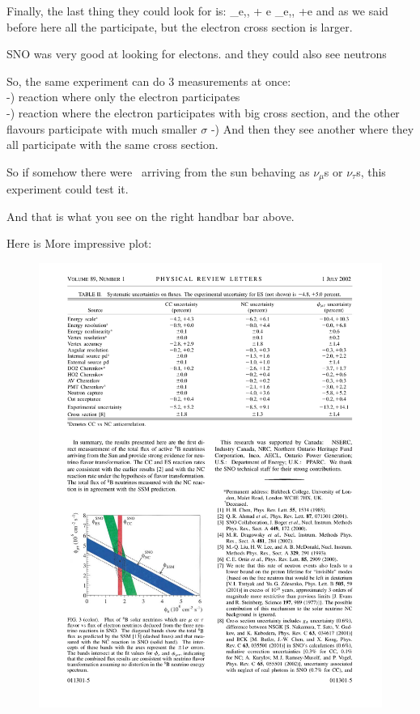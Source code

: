 {Finally,  the last thing they could look for is:
\be
\nu_{e,\mu,\tau} + e  \rightarrow \nu_{e,\mu,\tau} +e
\ee
and as we said before here all the \nus participate, but the electron cross section is larger.

SNO was very good at looking for electons. and they could also see neutrons

So, the same experiment can do 3 measurements at once:\\
 -) reaction where only the electron participates\\
 -) reaction where the electron participates with big cross section, and the other flavours participate with much smaller $\sigma$
 -) And then they see another where they all participate with the same cross section. 


So if somehow there were \nus\ arriving from the sun behaving as $\nu_\mu$s or $\nu_\tau$s, this experiment could test it. 

And that is what you see on the right handbar bar above. 

Here is More impressive plot: 

\begin{figure}[h!]
\centering
\includegraphics[width=1.0\textwidth]{./SNOResult.pdf}
\end{figure}

}
